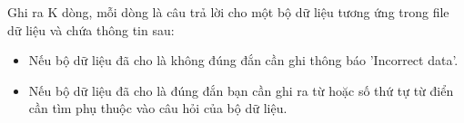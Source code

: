 Ghi ra K dòng, mỗi dòng là câu trả lời cho một bộ dữ liệu tương ứng trong file dữ liệu và chứa thông tin sau:  
\begin{itemize}
	\item     Nếu bộ dữ liệu đã cho là không đúng đắn cần ghi thông báo 'Incorrect data'.   
	\item     Nếu bộ dữ liệu đã cho là đúng đắn bạn cần ghi ra từ hoặc số thứ tự từ điển cần tìm phụ thuộc vào câu hỏi của bộ dữ liệu.   
\end{itemize}